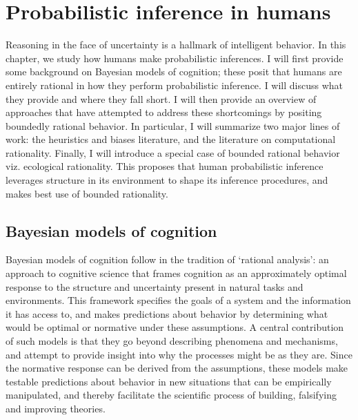 

\chapter{Probabilistic inference in humans}
\label{chap:psych}

Reasoning in the face of uncertainty is a hallmark of intelligent behavior. In this chapter, we study how humans make probabilistic inferences. I will first provide some background on Bayesian models of cognition; these posit that humans are entirely rational in how they perform probabilistic inference. I will discuss what they provide and where they fall short. I will then provide an overview of approaches that have attempted to address these shortcomings by positing boundedly rational behavior. In particular, I will summarize two major lines of work: the heuristics and biases literature, and the literature on computational rationality. Finally, I will introduce a special case of bounded rational behavior viz. ecological rationality. This proposes that human probabilistic inference leverages structure in its environment to shape its inference procedures, and makes best use of bounded rationality.

\section{Bayesian models of cognition}
Bayesian models of cognition follow in the tradition of `rational analysis'\cite{shepard1987toward, anderson1990adaptive}: an approach to cognitive science that frames cognition as an approximately optimal response to the structure and uncertainty present in natural tasks and environments. This framework specifies the goals of a system and the information it has access to, and makes predictions about behavior by determining what would be optimal or normative under these assumptions. A central contribution of such models is that they go beyond describing phenomena and mechanisms, and attempt to provide insight into why the processes might be as they are. Since the normative response can be derived from the assumptions, these models make testable predictions about behavior in new situations that can be empirically manipulated, and thereby facilitate the scientific process of building, falsifying and improving theories.

